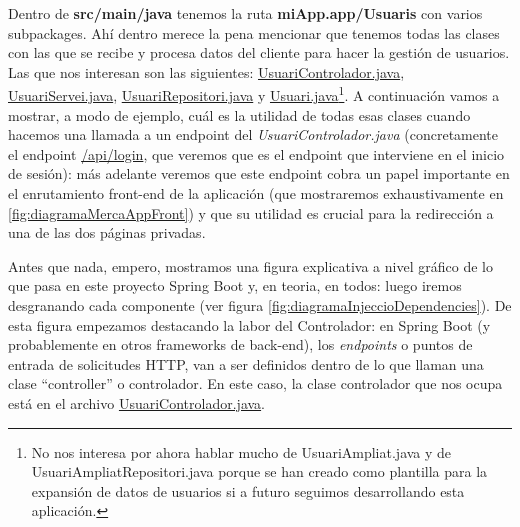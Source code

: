 \documentclass[a4paper,12pt]{report}
\begin{document}
				
				Dentro de \textbf{src/main/java} tenemos la ruta \textbf{miApp.app/Usuaris} con varios subpackages. Ahí dentro merece la pena mencionar que tenemos todas las clases con las que se recibe y procesa datos del cliente para hacer la gestión de usuarios. Las que nos interesan son las siguientes:
				\href{https://github.com/blackcub3s/mercApp/blob/main/APP%20WEB/__springboot__produccio__/app/src/main/java/miApp/app/Usuaris/controlador/UsuariControlador.java}{UsuariControlador.java}, 
				\href{https://github.com/blackcub3s/mercApp/blob/main/APP%20WEB/__springboot__produccio__/app/src/main/java/miApp/app/Usuaris/servei/UsuariServei.java}{UsuariServei.java}, 
				\href{https://github.com/blackcub3s/mercApp/blob/main/APP%20WEB/__springboot__produccio__/app/src/main/java/miApp/app/Usuaris/repositori/UsuariRepositori.java}{UsuariRepositori.java} y 
				\href{https://github.com/blackcub3s/mercApp/blob/main/APP%20WEB/__springboot__produccio__/app/src/main/java/miApp/app/Usuaris/model/Usuari.java}{Usuari.java}\footnote{No nos interesa por ahora hablar mucho de UsuariAmpliat.java y de UsuariAmpliatRepositori.java porque se han creado como plantilla para la expansión de datos de usuarios si a futuro seguimos desarrollando esta aplicación.}. 
				A continuación  vamos a mostrar, a modo de ejemplo, cuál es la utilidad de todas esas clases cuando hacemos una llamada a un endpoint del \textit{UsuariControlador.java} (concretamente el endpoint \href{https://github.com/blackcub3s/mercApp/blob/78c9f573613d94a9d9de6ee046aa5d6f02f0f425/APP%20WEB/__springboot__produccio__/app/src/main/java/miApp/app/Usuaris/controlador/UsuariControlador.java#L103}{/api/login}, que veremos que es el endpoint que interviene en el inicio de sesión): más adelante veremos que este endpoint cobra un papel importante en el enrutamiento front-end de la aplicación (que mostraremos exhaustivamente en \ref{fig:diagramaMercaAppFront}) y que su utilidad es crucial para la redirección a una de las dos páginas privadas.
				
				 Antes que nada, empero, mostramos una figura explicativa a nivel gráfico de lo que pasa en este proyecto Spring Boot y, en teoria, en todos: luego iremos desgranando cada componente (ver figura \ref{fig:diagramaInjeccioDependencies}). De esta figura empezamos destacando la labor del Controlador: en Spring Boot (y probablemente en otros frameworks de back-end), los \textit{endpoints} o puntos de entrada de solicitudes HTTP, van a ser definidos dentro de lo que llaman una clase ``controller'' o controlador. En este caso, la clase controlador que nos ocupa está en el archivo \href{https://github.com/blackcub3s/mercApp/blob/main/APP%20WEB/__springboot__produccio__/app/src/main/java/miApp/app/Usuaris/controlador/UsuariControlador.java}{UsuariControlador.java}. 
				
\end{document}
